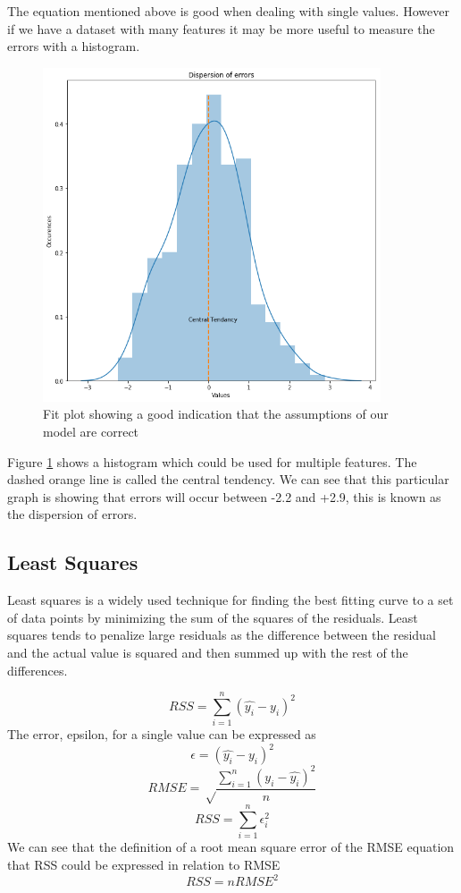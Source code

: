The equation mentioned above is good when dealing with single values. However if we have a dataset with many features it may be more useful to measure the errors with a histogram.

\begin{figure}[H]
  \centering
  \includegraphics[scale=0.5,width=100mm]{./images/graph-histogram.png}
  \caption{Fit plot showing a good indication that the assumptions of our model are correct}
  \label{fig:graph-histogram}
\end{figure}
Figure \ref{fig:graph-histogram} shows a histogram which could be used for multiple features. The dashed orange line is called the central tendency. We can see that this particular graph is showing that errors will occur between -2.2 and +2.9, this is known as the dispersion of errors.

\subsection{Least Squares}

Least squares is a widely used technique for finding the best fitting curve to a set of data points by minimizing the sum of the squares of the residuals. Least squares tends to penalize large residuals as the difference between the residual and the actual value is squared and then summed up with the rest of the differences.

\begin{equation}
RSS=\sum^n_{i=1}(\hat{y_i}- y_i)^2
\end{equation}
The error, epsilon, for a single value can be expressed as
\begin{equation}
\epsilon = (\hat{y_i}- y_i)^2
\end{equation}
\begin{equation}
RMSE = \sqrt\frac{\sum\limits_{i=1}^{n}(y_i-\hat{y_i})^2}{n}
\end{equation}
\begin{equation}
RSS = \sum^n_{i=1}\epsilon_i^2
\end{equation}
We can see that the definition of a root mean square error of the RMSE equation that RSS could be expressed in relation to RMSE
\begin{equation}
RSS = nRMSE^2
\end{equation}



